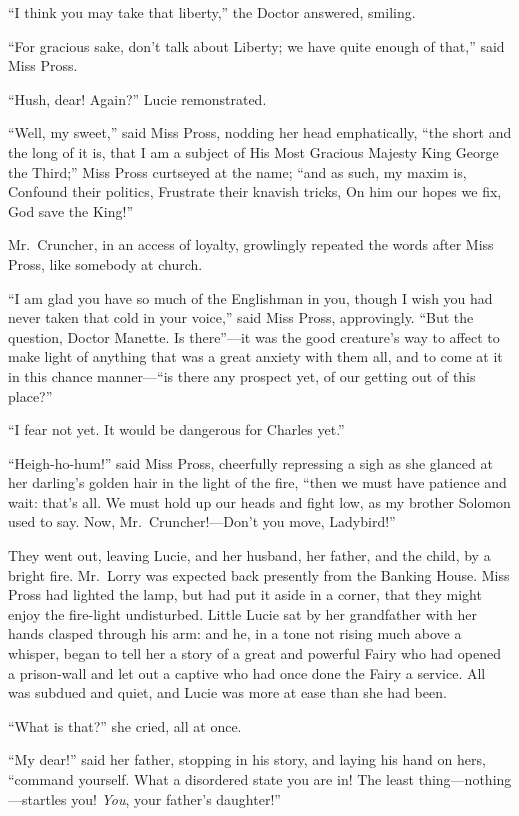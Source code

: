 ``I think you may take that liberty,'' the Doctor answered, smiling.

``For gracious sake, don't talk about Liberty; we have quite enough of
that,'' said Miss Pross.

``Hush, dear!  Again?'' Lucie remonstrated.

``Well, my sweet,'' said Miss Pross, nodding her head emphatically,
``the short and the long of it is, that I am a subject of His Most
Gracious Majesty King George the Third;'' Miss Pross curtseyed at the
name; ``and as such, my maxim is, Confound their politics, Frustrate
their knavish tricks, On him our hopes we fix, God save the King!''

Mr.\ Cruncher, in an access of loyalty, growlingly repeated the words
after Miss Pross, like somebody at church.

``I am glad you have so much of the Englishman in you, though I wish
you had never taken that cold in your voice,'' said Miss Pross,
approvingly.  ``But the question, Doctor Manette.  Is there''---it was
the good creature's way to affect to make light of anything that was
a great anxiety with them all, and to come at it in this chance
manner---``is there any prospect yet, of our getting out of this place?''

``I fear not yet.  It would be dangerous for Charles yet.''

``Heigh-ho-hum!'' said Miss Pross, cheerfully repressing a sigh as she
glanced at her darling's golden hair in the light of the fire,
``then we must have patience and wait:  that's all.  We must hold up
our heads and fight low, as my brother Solomon used to say.
Now, Mr.\ Cruncher!---Don't you move, Ladybird!''

They went out, leaving Lucie, and her husband, her father, and the
child, by a bright fire.  Mr.\ Lorry was expected back presently from
the Banking House.  Miss Pross had lighted the lamp, but had put it
aside in a corner, that they might enjoy the fire-light undisturbed.
Little Lucie sat by her grandfather with her hands clasped through
his arm:  and he, in a tone not rising much above a whisper, began to
tell her a story of a great and powerful Fairy who had opened a
prison-wall and let out a captive who had once done the Fairy a
service.  All was subdued and quiet, and Lucie was more at ease than
she had been.

``What is that?'' she cried, all at once.

``My dear!'' said her father, stopping in his story, and laying his
hand on hers, ``command yourself.  What a disordered state you are in!
The least thing---nothing---startles you!  \emph{You}, your father's daughter!''

